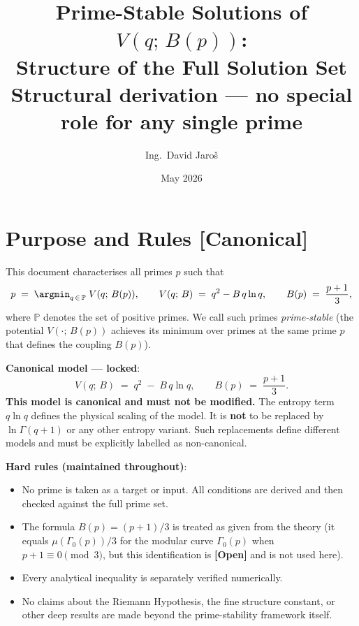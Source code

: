 \documentclass[12pt,a4paper]{article}
\title{\textbf{Prime-Stable Solutions of $V(q;\,B(p))$:\\
         Structure of the Full Solution Set}\\
         \large Structural derivation — no special role for any single prime}
\author{Ing.\ David Jaro\v{s}}
\date{May 2026}
\theoremstyle{definition}
\theoremstyle{remark}
\newcommand{\PP}{\mathbb{P}}
\newcommand{\OPEN}{\textbf{[Open]}}
\begin{document}
  \maketitle
  \tableofcontents
  \newpage
\fi

\section{Purpose and Rules \textnormal{[Canonical]}}
\label{sec:pss:purpose}

This document characterises all primes $p$ such that
\[
  p \;=\; \argmin_{q\,\in\,\PP}\; V(q;\,B(p)),
  \qquad
  V(q;\,B) \;=\; q^2 - B\,q\ln q,
  \qquad
  B(p) \;=\; \frac{p+1}{3},
\]
where $\PP$ denotes the set of positive primes.
We call such primes \emph{prime-stable} (the potential $V(\cdot;\,B(p))$ achieves
its minimum over primes at the same prime $p$ that defines the coupling $B(p)$).

\begin{warnbox}
\textbf{Canonical model — locked}:
\[
  V(q;\,B) \;=\; q^2 \;-\; B\,q\ln q, \qquad B(p) \;=\; \frac{p+1}{3}.
\]
\textbf{This model is canonical and must not be modified.}
The entropy term $q\ln q$ defines the physical scaling of the model.
It is \textbf{not} to be replaced by $\ln\Gamma(q+1)$ or any other entropy
variant.  Such replacements define different models and must be explicitly
labelled as non-canonical.

\medskip
\textbf{Hard rules (maintained throughout)}:
\begin{itemize}
  \item No prime is taken as a target or input.  All conditions are derived and
        then checked against the full prime set.
  \item The formula $B(p)=(p+1)/3$ is treated as given from the theory
        (it equals $\mu(\Gamma_0(p))/3$ for the modular curve $\Gamma_0(p)$
        when $p+1 \equiv 0\pmod{3}$, but this identification is \OPEN{} and is
        not used here).
  \item Every analytical inequality is separately verified numerically.
  \item No claims about the Riemann Hypothesis, the fine structure constant, or
        other deep results are made beyond the prime-stability framework itself.
\end{itemize}
\end{warnbox}
\end{document}

